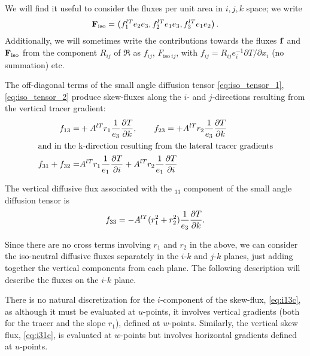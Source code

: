 \documentclass[../tex_main/NEMO_manual]{subfiles}
\begin{document}
We will find it useful to consider the fluxes per unit area in $i,j,k$ space; we write
\begin{equation}
  \label{eq:Fijk}
  \mathbf{F}_{\mathrm{iso}}=\left(f_1^{lT}e_2e_3, f_2^{lT}e_1e_3, f_3^{lT}e_1e_2\right).
\end{equation}
Additionally, we will sometimes write the contributions towards the fluxes $\mathbf{f}$ and
$\mathbf{F}_{\mathrm{iso}}$ from the component $R_{ij}$ of $\Re$ as $f_{ij}$, $F_{\mathrm{iso}\: ij}$,
with $f_{ij}=R_{ij}e_i^{-1}\partial T/\partial x_i$ (no summation) etc.

The off-diagonal terms of the small angle diffusion tensor
\autoref{eq:iso_tensor_1}, \autoref{eq:iso_tensor_2} produce skew-fluxes along
the $i$- and $j$-directions resulting from the vertical tracer gradient:
\begin{align}
  \label{eq:i13c}
  f_{13}=&+{A^{lT}} r_1\frac{1}{e_3}\frac{\partial T}{\partial k},\qquad f_{23}=+{A^{lT}} r_2\frac{1}{e_3}\frac{\partial T}{\partial k}\\
\intertext{and in the k-direction resulting from the lateral tracer gradients}
  \label{eq:i31c}
 f_{31}+f_{32}=& {A^{lT}} r_1\frac{1}{e_1}\frac{\partial T}{\partial i}+{A^{lT}} r_2\frac{1}{e_1}\frac{\partial T}{\partial i}
\end{align}

The vertical diffusive flux associated with the $_{33}$ component of the small angle diffusion tensor is
\begin{equation}
  \label{eq:i33c}
  f_{33}=-{A^{lT}}(r_1^2 +r_2^2) \frac{1}{e_3}\frac{\partial T}{\partial k}.
\end{equation}

Since there are no cross terms involving $r_1$ and $r_2$ in the above,
we can consider the iso-neutral diffusive fluxes separately in the $i$-$k$ and $j$-$k$ planes,
just adding together the vertical components from each plane.
The following description will describe the fluxes on the $i$-$k$ plane.

There is no natural discretization for the $i$-component of the skew-flux, \autoref{eq:i13c},
as although it must be evaluated at $u$-points,
it involves vertical gradients (both for the tracer and the slope $r_1$), defined at $w$-points.
Similarly, the vertical skew flux, \autoref{eq:i31c},
is evaluated at $w$-points but involves horizontal gradients defined at $u$-points.
\end{document}

